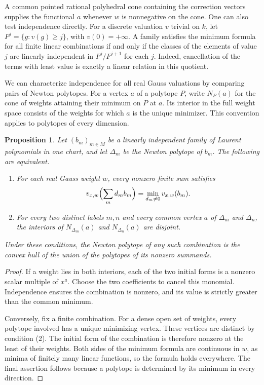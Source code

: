 \documentclass[11pt,reqno]{amsart}
\numberwithin{equation}{section}
\newtheorem{proposition}[theorem]{Proposition}
\theoremstyle{definition}
\theoremstyle{remark}
\begin{document}
A common pointed rational polyhedral cone containing the correction
vectors supplies the functional \(a\) whenever \(w\) is nonnegative on
the cone. One can also test independence directly. For a discrete
valuation \(v\) trivial on \(k\), let \(F^j=\{g:v(g)\ge j\}\),
with \(v(0)=+\infty\). A family satisfies the minimum formula for all
finite linear combinations if and only if the classes of the elements of
value \(j\) are linearly independent in \(F^j/F^{j+1}\) for each \(j\).
Indeed, cancellation of the terms with least value is exactly a linear
relation in this quotient.

We can characterize independence for all real Gauss valuations by
comparing pairs of Newton polytopes. For a vertex \(a\) of a polytope
\(P\), write \(N_P(a)\) for the cone of weights attaining their
minimum on \(P\) at \(a\). Its interior in the full weight space
consists of the weights for which \(a\) is the unique minimizer. This
convention applies to polytopes of every dimension.

\begin{proposition}\label{prop:boundary-vertex-criterion}
Let \((b_m)_{m\in M}\) be a linearly independent family of Laurent
polynomials in one chart, and let \(\Delta_m\) be the Newton polytope of
\(b_m\). The following are equivalent.
\begin{enumerate}
\item For each real Gauss weight \(w\), every nonzero finite sum satisfies
      \[ v_{x,w}\Bigl(\sum_m d_m b_m\Bigr)=\min_{d_m\ne0} v_{x,w}(b_m). \]
\item For every two distinct labels \(m,n\) and every common vertex
      \(a\) of \(\Delta_m\) and \(\Delta_n\), the interiors of
      \(N_{\Delta_m}(a)\) and \(N_{\Delta_n}(a)\) are disjoint.
\end{enumerate}
Under these conditions, the Newton polytope of any such combination is
the convex hull of the union of the polytopes of its nonzero summands.
\end{proposition}

\begin{proof}
If a weight lies in both interiors, each of the two initial forms is a
nonzero scalar multiple of \(x^a\). Choose the two coefficients to
cancel this monomial. Independence ensures the combination is nonzero,
and its value is strictly greater than the common minimum.

Conversely, fix a finite combination. For a dense open set of weights,
every polytope involved has a unique minimizing vertex. These vertices
are distinct by condition (2). The initial form of the combination is
therefore nonzero at the least of their weights. Both sides of the
minimum formula are continuous in \(w\), as minima of finitely many
linear functions, so the formula holds everywhere. The final assertion
follows because a polytope is determined by its minimum in every
direction.
\end{proof}
\end{document}

